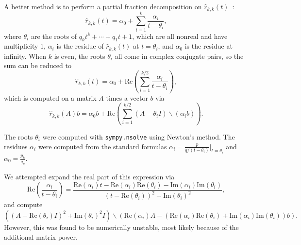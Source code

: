 A better method is to perform a partial fraction decomposition on $\hat{r}_{k,
  k}(t)$~\cite{pusa2010computing}:
\begin{equation}
\label{eq:part-frac}
  \hat{r}_{k, k}(t) = \alpha_0 + \sum_{i=1}^k \frac{\alpha_i}{t - \theta_i},
\end{equation}
where $\theta_i$ are the roots of $q_kt^k + \cdots + q_1t + 1$, which are all
nonreal and have multiplicity 1, $\alpha_i$ is the residue of
$\hat{r}_{k, k}(t)$ at $t=\theta_i$, and $\alpha_0$ is the residue at
infinity. When $k$ is even, the roots $\theta_i$ all come in complex conjugate
pairs, so the sum can be reduced to
\begin{equation}
  \hat{r}_{k, k}(t) = \alpha_0 + \mathrm{Re}\left(\sum_{i=1}^{k/2} \frac{\alpha_i}{t - \theta_i}\right),
\end{equation}
which is computed on a matrix $A$ times a vector $b$ via
\begin{equation}
\label{eq:part-frac-matrix-re}
  \hat{r}_{k, k}(A)b = \alpha_0b + \mathrm{Re}\left(\sum_{i=1}^{k/2} (A -
    \theta_i I)\backslash(\alpha_i b) \right).
\end{equation}

The roots $\theta_i$ were computed with \texttt{sympy.nsolve} using Newton's
method.
 The
residues $\alpha_i$ were computed from the standard formulas  $\alpha_i =
\frac{p}{q/(t - \theta_i)}|_{t=\theta_i}$ and $\alpha_0=\frac{p_k}{q_k}$.

We attempted expand the real part of this expression via
\begin{equation}
\mathrm{Re}\left(\frac{\alpha_i}{t - \theta_i}\right) = \frac{\mathrm{Re}{(\alpha_{i})}t - \mathrm{Re}{(\alpha_{i})} \mathrm{Re}{(\theta_{i})} - \mathrm{Im}{(\alpha_{i})} \mathrm{Im}{(\theta_{i})}}{\left(t - \mathrm{Re}{(\theta_{i})}\right)^{2} + \mathrm{Im}{(\theta_{i})}^{2}},
\end{equation}
and compute
\begin{equation}
\left(\left(A - \mathrm{Re}{(\theta_{i})I}\right)^{2} +
  \mathrm{Im}{(\theta_{i})}^{2}I\right)\backslash \left(\mathrm{Re}{(\alpha_{i})}A - (\mathrm{Re}{(\alpha_{i})} \mathrm{Re}{(\theta_{i})} + \mathrm{Im}{(\alpha_{i})} \mathrm{Im}{(\theta_{i})})b\right).
\end{equation}
However, this was found to be numerically unstable, most likely because of the
additional matrix power. %

